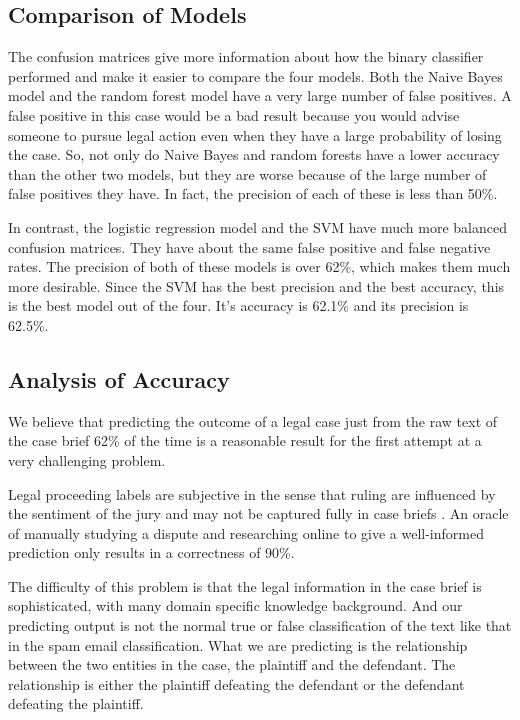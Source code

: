 \documentclass[journal]{IEEEtran}
\begin{document}
\subsection{Comparison of Models}

The confusion matrices give more information about how the binary classifier performed and make it easier to compare the four models. Both the Naive Bayes model and the random forest model have a very large number of false positives. A false positive in this case would be a bad result because you would advise someone to pursue legal action even when they have a large probability of losing the case. So, not only do Naive Bayes and random forests have a lower accuracy than the other two models, but they are worse because of the large number of false positives they have. In fact, the precision of each of these is less than 50\%.

In contrast, the logistic regression model and the SVM have much more balanced confusion matrices. They have about the same false positive and false negative rates. The precision of both of these models is over 62\%, which makes them much more desirable. Since the SVM has the best precision and the best accuracy, this is the best model out of the four. It's accuracy is 62.1\% and its precision is 62.5\%. 

\subsection{Analysis of Accuracy}

We believe that predicting the outcome of a legal case just from the raw text of the case brief 62\% of the time is a reasonable result for the first attempt at a very challenging problem. 

Legal proceeding labels are subjective in the sense that ruling are influenced by the sentiment of the jury and may not be captured fully in case briefs \cite{ObjectiveAndSubjective}. An oracle of manually studying a dispute and researching online to give a well-informed prediction only results in a correctness of 90\%.

The difficulty of this problem is that the legal information in the case brief is sophisticated, with many domain specific knowledge background. And our predicting output is not the normal true or false classification of the text like that in the spam email classification. What we are predicting is the relationship between the two entities in the case, the plaintiff and the defendant. The relationship is either the plaintiff defeating the defendant or the defendant defeating the plaintiff.
\end{document}
